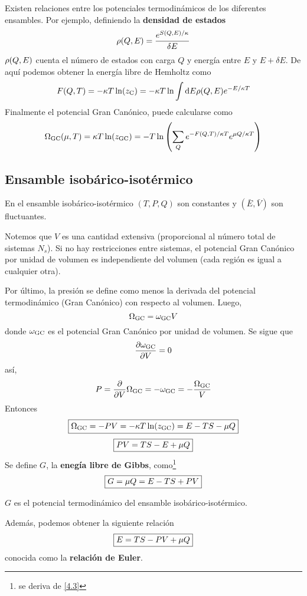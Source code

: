 Existen relaciones entre los potenciales termodinámicos de los diferentes ensambles. Por ejemplo, definiendo la \textbf{densidad de estados}
\begin{equation}
  \rho(Q,E)=\frac{e^{S(Q,E)/\kappa}}{\delta E}	
\end{equation}
$\rho(Q,E)$ cuenta el número de estados con carga $Q$ y energía entre $E$ y $E+\delta E$. De aquí podemos obtener la energía libre de Hemholtz como
\begin{equation}
  F(Q,T)=-\kappa T\ln(z_{\rm C})=-\kappa T\ln\int\dd E\rho(Q,E)e^{-E/\kappa T}
\end{equation}
Finalmente el potencial Gran Canónico, puede calcularse como
\begin{equation}
  \Omega_{\rm GC}(\mu,T)=\kappa T\ln(z_{\rm GC})=-T\ln\left(\sum_Qe^{-F(Q,T)/\kappa T}e^{\mu Q/\kappa T}\right)
\end{equation}

\subsection{Ensamble isobárico-isotérmico}
En el ensamble isobárico-isotérmico $(T,P,Q)$ son constantes y $(\bar{E},\bar{V})$ son fluctuantes.

Notemos que $V$ es una cantidad extensiva (proporcional al número total de sistemas $N_s$). Si no hay restricciones entre sistemas, el potencial Gran Canónico por unidad de volumen es independiente del volumen (cada región es igual a cualquier otra).

Por último, la presión se define como menos la derivada del potencial termodinámico (Gran Canónico) con respecto al volumen. Luego,
\begin{equation}
  \Omega_{\rm GC}=\omega_{\rm GC}V
\end{equation}
donde $\omega_{\rm GC}$ es el potencial Gran Canónico por unidad de volumen. Se sigue que
\begin{equation}
  \pdv{\omega_{\rm GC}}{V}=0
\end{equation}
así,
\begin{equation}
  P=\pdv{V}\Omega_{\rm GC}=-\omega_{\rm GC}=-\frac{\Omega_{\rm GC}}{V}
\end{equation}
Entonces
\begin{equation}
\boxed{  \Omega_{\rm GC}=-PV=-\kappa T\ln(z_{\rm GC})=E-TS-\mu Q}
\end{equation}
\begin{equation}\label{4.3}
\boxed{  PV=TS-E+\mu Q}
\end{equation}
Se define $G$, la \textbf{enegía libre de Gibbs}, como\footnote{se deriva de \eqref{4.3}}
\begin{equation}
\boxed{  G=\mu Q=E-TS+PV}
\end{equation}

$G$ es el potencial termodinámico del ensamble isobárico-isotérmico.

Además, podemos obtener la siguiente relación
\begin{equation}
\boxed{  E=TS-PV+\mu Q}
\end{equation}
conocida como la \textbf{relación de Euler}.





















